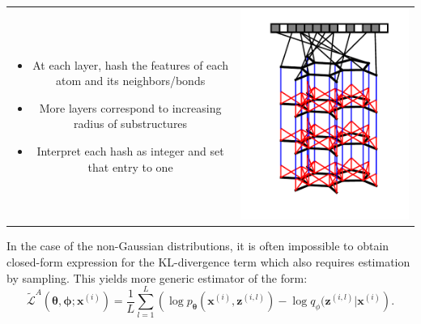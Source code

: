 \documentclass[landscape,a0b,final,a4resizeable]{include/a0poster}
\begin{document}
\begin{poster}
\begin{multicols}{3}
\begin{tabular}{cc}
\begin{minipage}[c]{0.5\columnwidth}
\begin{itemize}
  \item At each layer, hash the features of each atom and its neighbors/bonds
  \item More layers correspond to increasing radius of substructures
  \item Interpret each hash as integer and set that entry to one
\end{itemize}
\end{minipage} & 
\begin{minipage}[c]{0.5\columnwidth}
\centerline{\includegraphics[width=0.9\columnwidth, clip, trim=4mm 12mm 4mm 4mm]{figures/fig_1}}
\end{minipage}
\end{tabular}

\vspace{0.5in}



\newpage %


In the case of the non-Gaussian distributions, it is often impossible to obtain closed-form expression for the KL-divergence term which also requires estimation by sampling. This yields more generic estimator of the form:
$$ \widetilde{\mathcal{L}}^{A}(\boldsymbol{\theta}, \boldsymbol{\phi}; \mathbf{x}^{(i)}) = \frac{1}{L} \sum_{l=1}^L \left( \log p_{\boldsymbol{\theta}}(\mathbf{x}^{(i)}, \mathbf{z}^{(i,l)}) - \log q_{\phi}(\mathbf{z}^{(i,l)} | \mathbf{x}^{(i)} \right).$$


\end{multicols}
\end{poster}
\end{document}
